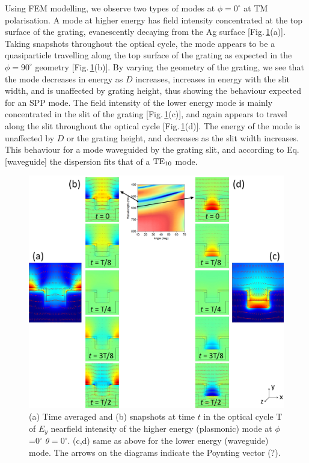 Using FEM modelling, we observe two types of modes at $\phi=0^{\circ}$ at TM polarisation. A mode at higher energy has field intensity concentrated at the top surface of the grating, evanescently decaying from the Ag surface [Fig.\,\ref{7Fig12}(a)]. Taking snapshots throughout the optical cycle, the mode appears to be a quasiparticle travelling along the top surface of the grating as expected in the $\phi=90^{\circ}$ geometry [Fig.\,\ref{7Fig12}(b)]. By varying the geometry of the grating, we see that the mode decreases in energy as $D$ increases, increases in energy with the slit width, and is unaffected by grating height, thus showing the behaviour expected for an SPP mode. The field intensity of the lower energy mode is mainly concentrated in the slit of the grating [Fig.\,\ref{7Fig12}(c)], and again appears to travel along the slit throughout the optical cycle [Fig.\,\ref{7Fig12}(d)]. The energy of the mode is unaffected by $D$ or the grating height, and decreases as the slit width increases. This behaviour for a mode waveguided by the grating slit, and according to Eq.[waveguide] the dispersion fits that of a $\textnormal{TE}_{10}$ mode. 
\begin{figure}[ht] 
\centering    
\includegraphics[width=\textwidth]{Fig12}
\caption{(a) Time averaged and (b) snapshots at time $t$ in the optical cycle T of $E_y$ nearfield intensity of the higher energy (plasmonic) mode at $\phi$=$0^{\circ}$ $\theta=0^{\circ}$. (c,d) same as above for the lower energy (waveguide) mode. The arrows on the diagrams indicate the Poynting vector (?). }
\label{7Fig12}
\end{figure}

